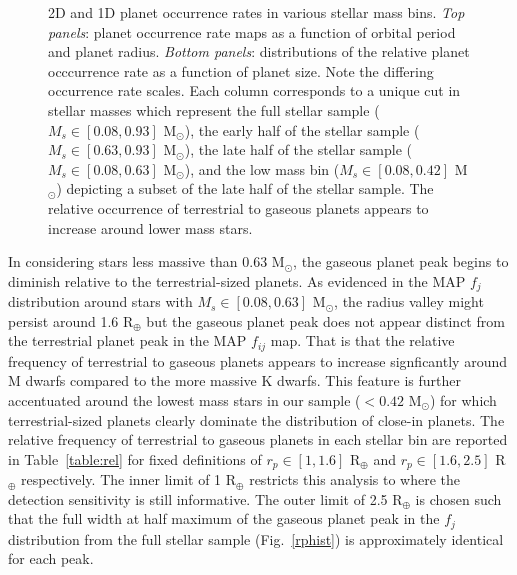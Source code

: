 \documentclass[twocolumn]{emulateapj}
\begin{document}
\begin{figure*}
  \centering
  \caption{2D and 1D planet occurrence rates in various stellar mass bins. \emph{Top panels}: planet occurrence
    rate maps as a function of orbital period and planet radius. \emph{Bottom panels}: distributions of the relative
    planet occcurrence rate as a function of planet size. Note the differing occurrence rate scales.
    Each column corresponds to a unique cut in stellar masses
    which represent the full stellar sample ($M_s \in [0.08,0.93]$ M$_{\odot}$), the early half of the stellar sample
    ($M_s \in [0.63,0.93]$ M$_{\odot}$), the late half of the stellar sample ($M_s \in [0.08,0.63]$ M$_{\odot}$),
    and the low mass bin ($M_s \in [0.08,0.42]$ M$_{\odot}$) depicting a subset of the late half of the stellar sample.
    The relative occurrence of terrestrial to gaseous planets appears to increase around lower mass stars.}
  \label{fig:rphistcomp}
\end{figure*}

In considering stars less massive than 0.63 M$_{\odot}$, the gaseous planet peak begins to diminish relative
to the terrestrial-sized planets. As evidenced in the MAP $f_j$ distribution around stars with
$M_s \in [0.08,0.63]$ M$_{\odot}$, the radius valley might persist around 1.6 R$_{\oplus}$ but the gaseous planet
peak does not appear distinct from the terrestrial planet peak in the MAP $f_{ij}$ map. That is that the relative
frequency of terrestrial to gaseous planets appears to increase signficantly around M dwarfs compared to the more
massive K dwarfs. This feature is further accentuated around the lowest mass stars in our sample ($<0.42$
M$_{\odot}$) for which terrestrial-sized planets clearly dominate the distribution of close-in planets. The relative
frequency of terrestrial to gaseous planets in each stellar bin are reported in Table~\ref{table:rel}
for fixed definitions of $r_p \in [1,1.6]$ R$_{\oplus}$ and $r_p \in [1.6,2.5]$ R$_{\oplus}$ respectively. The inner
limit of 1 R$_{\oplus}$ restricts this analysis to where the detection sensitivity is still informative. The outer
limit of 2.5 R$_{\oplus}$ is chosen such that the full width at half maximum of the gaseous planet peak in the
$f_j$ distribution from the full stellar sample (Fig.~\ref{rphist}) is approximately identical for each peak.
\end{document}
